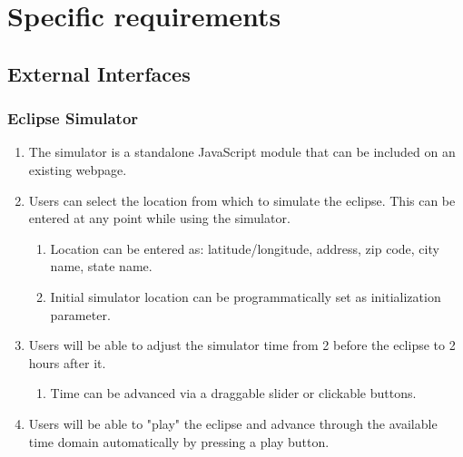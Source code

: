 \documentclass[10pt, onecolumn, draftclsnofoot, letterpaper, compsoc]{IEEEtran}
\begin{document}
\section{Specific requirements}

\subsection{External Interfaces}

\subsubsection{Eclipse Simulator}
	\begin{enumerate}
		\item The simulator is a standalone JavaScript module that can
		be included on an existing webpage.

		\item Users can select the location from which to simulate the eclipse.
		This can be entered at any point while using the simulator.
		\begin{enumerate}
			\item Location can be entered as: latitude/longitude, address, zip code,
			city name, state name.
			\item Initial simulator location can be programmatically set as
			initialization parameter.
		\end{enumerate}

		\item Users will be able to adjust the simulator time from 2 before
		the eclipse to 2 hours after it.
		\begin{enumerate}
			\item Time can be advanced via a draggable slider or clickable buttons.
		\end{enumerate}

        \item Users will be able to "play" the eclipse and advance through the available time
        domain automatically by pressing a play button.

	\end{enumerate}
\end{document}
